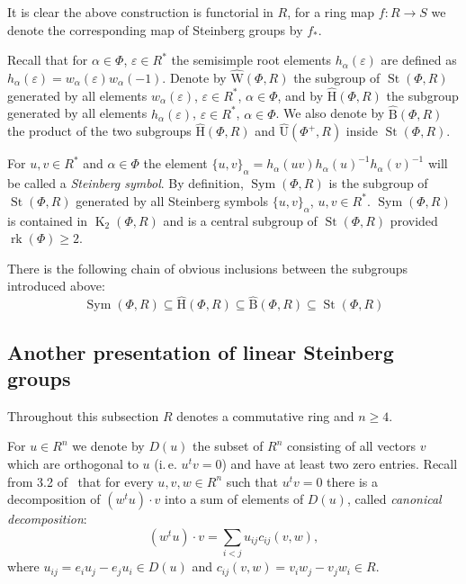 \documentclass[oneside, 10pt]{amsart}
\DeclareMathOperator{\St}{St}
\DeclareMathOperator{\K}{K}
\DeclareMathOperator{\rk}{rk}
\DeclareMathOperator{\Sym}{Sym}
\newcommand{\UU}{\hat{\mathrm{U}}}      %
\newcommand{\StB}{\hat{\mathrm{B}}}     %
\newcommand{\StH}{\hat{\mathrm{H}}}     %
\newcommand{\StW}{\hat{\mathrm{W}}}     %
\numberwithin{equation}{section}
\numberwithin{lemma}{section}
\theoremstyle{definition}
\theoremstyle{remark}
\begin{document}
It is clear the above construction is functorial in $R$, for a ring map $f\colon R\to S$ we denote the corresponding map of Steinberg groups by $f_*$.

Recall that for $\alpha\in\Phi$, $\varepsilon\in R^*$ the semisimple root elements $h_\alpha(\varepsilon)$ are defined as $h_\alpha(\varepsilon)=w_\alpha(\varepsilon)w_\alpha(-1)$.
Denote by $\StW(\Phi, R)$ the subgroup of $\St(\Phi, R)$ generated by all elements
$w_\alpha(\varepsilon)$, $\varepsilon\in R^*$, $\alpha\in\Phi$, and by $\StH(\Phi,R)$
 the subgroup generated by all elements $h_\alpha(\varepsilon)$, $\varepsilon\in R^*$, $\alpha\in\Phi$.
We also denote by $\StB(\Phi, R)$ the product of the two subgroups $\StH(\Phi, R)$ and $\UU(\Phi^+, R)$ inside $\St(\Phi, R)$.
 
For $u, v \in R^*$ and $\alpha\in\Phi$ the element $\{u,v\}_\alpha=h_\alpha(uv)h_\alpha(u)^{-1}h_\alpha(v)^{-1}$ will be
 called a {\it Steinberg symbol}. By definition, $\Sym(\Phi, R)$ is the subgroup of $\St(\Phi, R)$ generated by all Steinberg symbols $\{u, v\}_\alpha$, $u, v \in R^*$. 
$\Sym(\Phi, R)$ is contained in $\K_2(\Phi, R)$ and is a central subgroup of $\St(\Phi, R)$ provided $\rk(\Phi)\geq 2$.

There is the following chain of obvious inclusions between the subgroups introduced above:
\begin{equation}
  \Sym(\Phi, R) \subseteq \StH(\Phi, R) \subseteq \StB(\Phi, R) \subseteq \St(\Phi, R)
\end{equation}

\subsection{Another presentation of linear Steinberg groups} \label{sec:another-presentation}
Throughout this subsection $R$ denotes a commutative ring and $n \geq 4$.

For $u \in R^n$ we denote by $D(u)$ the subset of $R^n$ consisting of all vectors $v$ which are orthogonal to $u$ (i.\,e. $u^tv = 0$) and have at least two zero entries.
Recall from 3.2 of~\cite{Ka77} that for every $u, v, w \in R^n$ such that $u^t v = 0$ there
 is a decomposition of $(w^t u) \cdot v$ into a sum of elements of $D(u)$, called {\it canonical decomposition}:
\begin{equation} \label{eq:canonical} (w^tu) \cdot v=\sum_{i<j}u_{ij} c_{ij}(v, w),\end{equation}
where $u_{ij} =e_iu_j-e_ju_i \in D(u)$ and $c_{ij}(v, w) =v_iw_j-v_jw_i \in R$.
\end{document}
